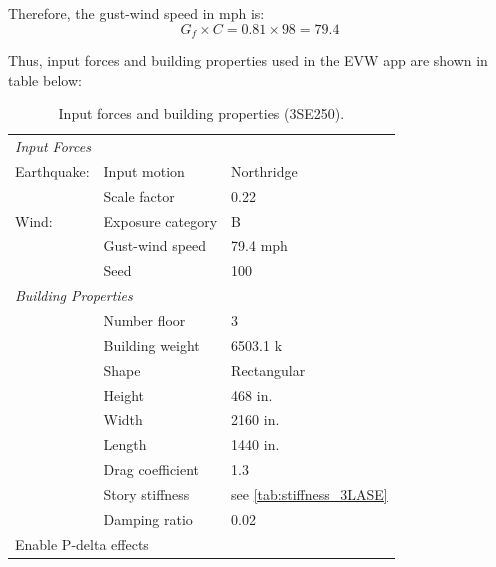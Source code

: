 \documentclass{simcenterdocumentation}
\begin{document}
Therefore, the gust-wind speed in mph is:
\begin{equation*}
G_f \times C = 0.81 \times 98 = \boxed{79.4}
\end{equation*}

Thus, input forces and building properties used in the EVW app are shown in table below:

\begin{table}[H]
	\centering \caption{Input forces and building properties (3SE250).}
	\begin{tabular}{lll}
	\toprule
	\multicolumn{3}{l}{\textit{Input Forces}}					\\
	\cmidrule(rl){1-3}
	Earthquake:		& Input motion		& Northridge			\\
					& Scale factor		& 0.22					\\
	Wind:			& Exposure category	& B						\\
					& Gust-wind speed	& 79.4 mph				\\
					& Seed				& 100					\\
	\midrule
	\multicolumn{3}{l}{\textit{Building Properties}}			\\
	\cmidrule(rl){1-3}
					& Number floor		& 3						\\
					& Building weight	& 6503.1 k				\\
					& Shape				& Rectangular			\\
					& Height			& 468 in.				\\
					& Width				& 2160 in.				\\
					& Length			& 1440 in.				\\
					& Drag coefficient	& 1.3					\\
					& Story stiffness	& see \cref{tab:stiffness_3LASE}			\\
					& Damping ratio		& 0.02					\\
	\midrule
	\multicolumn{3}{l}{Enable P-delta effects}					\\
	\bottomrule
	\end{tabular}
\end{table}
\end{document}
